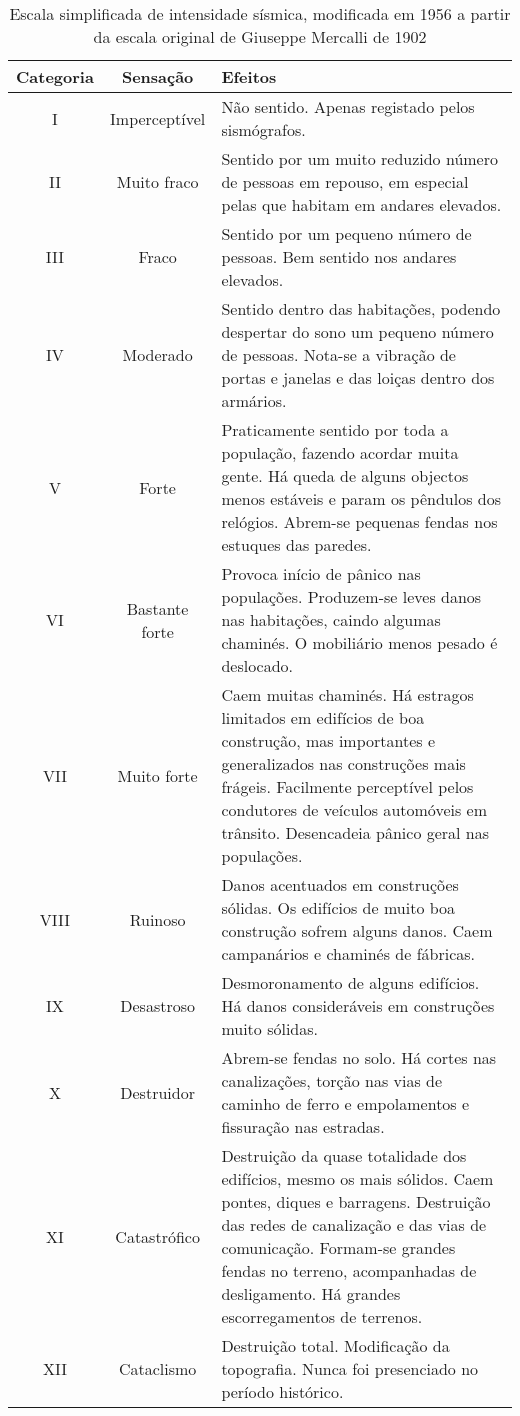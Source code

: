 \begin{table}[H]
\begin{center}
\begin{scriptsize}
\noindent\begin{tabular}{c|c|p{12cm}}
\hline
Categoria  	& Sensação & Efeitos \\
\hline
I 			&	Imperceptível 	&	Não sentido. Apenas registado pelos sismógrafos.
\\II 		&	Muito fraco 	&	Sentido por um muito reduzido número de pessoas em 
								repouso, em especial pelas que habitam em andares
								elevados.
\\III 		&	Fraco 			&	Sentido por um pequeno número de pessoas. Bem sentido nos andares elevados.
\\IV 		&	Moderado 		&	Sentido dentro das habitações, podendo despertar do sono um pequeno número de pessoas. 
								Nota-se a vibração de
								portas e janelas e das loiças dentro dos armários.
\\V 		&	Forte 			&	Praticamente sentido por toda a população, fazendo acordar muita gente. 
								Há queda de alguns objectos menos estáveis e param os pêndulos dos relógios. 
								Abrem-se pequenas fendas nos estuques das paredes.
\\VI 		&	Bastante forte 	&	Provoca início de pânico nas populações. Produzem-se leves danos nas habitações, 
								caindo algumas chaminés. O mobiliário menos pesado é deslocado.
\\VII 		&	Muito forte 	&	Caem muitas chaminés. Há estragos limitados em edifícios de boa construção, 
								mas importantes e generalizados nas construções mais frágeis. 
								Facilmente perceptível pelos condutores de veículos automóveis em trânsito. 
								Desencadeia pânico geral nas populações.
\\VIII 		&	Ruinoso  		&	Danos acentuados em construções sólidas. Os edifícios de muito boa construção 
								sofrem alguns danos. Caem campanários e chaminés de fábricas.
\\IX 		&	Desastroso 		&	Desmoronamento de alguns edifícios. Há danos consideráveis em construções muito sólidas.
\\X 		&	Destruidor 		&	Abrem-se fendas no solo. Há cortes nas canalizações, torção nas vias de caminho 
								de ferro e empolamentos e fissuração nas estradas.
\\XI 		&	Catastrófico 	&	Destruição da quase totalidade dos edifícios, mesmo os mais sólidos. 
								Caem pontes, diques e barragens. Destruição das redes de canalização e das vias de comunicação. 
								Formam-se grandes fendas no terreno, acompanhadas de desligamento. Há grandes escorregamentos de terrenos.
\\XII 		&	Cataclismo 		&	Destruição total. Modificação da topografia. Nunca foi presenciado no período histórico. \\
\hline
\end{tabular}
\caption{Escala simplificada de intensidade sísmica, modificada em 1956 a partir da escala original de Giuseppe Mercalli de 1902}
\label{tab:mercalli}
\end{scriptsize}
\end{center}
\end{table}

